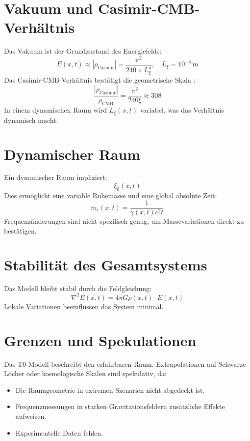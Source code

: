 \documentclass[12pt,a4paper]{article}
\begin{document}
	\section{Vakuum und Casimir-CMB-Verhältnis}
	Das Vakuum ist der Grundzustand des Energiefelds:
	\begin{equation}
		E(x,t) \approx |\rho_{\text{Casimir}}| = \frac{\pi^2}{240 \times L_\xi^4}, \quad L_\xi = 10^{-4} \, \text{m}
	\end{equation}
	Das Casimir-CMB-Verhältnis bestätigt die geometrische Skala \cite{Casimir1948, Planck2018}:
	\begin{equation}
		\frac{|\rho_{\text{Casimir}}|}{\rho_{\text{CMB}}} = \frac{\pi^2}{240 \xi} \approx 308
	\end{equation}
	In einem dynamischen Raum wird \(L_\xi(x,t)\) variabel, was das Verhältnis dynamisch macht.
	
	\section{Dynamischer Raum}
	Ein dynamischer Raum impliziert:
	\begin{equation}
		\xi_0(x,t)
	\end{equation}
	Dies ermöglicht eine variable Ruhemasse und eine global absolute Zeit:
	\begin{equation}
		m_i(x,t) = \frac{1}{\gamma(x,t) c^2 t}
	\end{equation}
	Frequenzänderungen sind nicht spezifisch genug, um Massevariationen direkt zu bestätigen.
	
	\section{Stabilität des Gesamtsystems}
	Das Modell bleibt stabil durch die Feldgleichung:
	\begin{equation}
		\nabla^2 E(x,t) = 4\pi G \rho(x,t) \cdot E(x,t)
	\end{equation}
	Lokale Variationen beeinflussen das System minimal.
	
	\section{Grenzen und Spekulationen}
	Das T0-Modell beschreibt den erfahrbaren Raum. Extrapolationen auf Schwarze Löcher oder kosmologische Skalen sind spekulativ, da:
	\begin{itemize}
		\item Die Raumgeometrie in extremen Szenarien nicht abgedeckt ist.
		\item Frequenzmessungen in starken Gravitationsfeldern zusätzliche Effekte aufweisen.
		\item Experimentelle Daten fehlen.
	\end{itemize}
	
\end{document}
